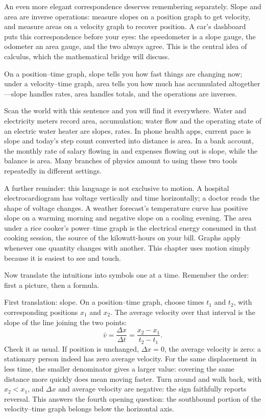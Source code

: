 An even more elegant correspondence deserves remembering separately. Slope and area are inverse operations: measure slopes on a position graph to get velocity, and measure areas on a velocity graph to recover position. A car's dashboard puts this correspondence before your eyes: the speedometer is a slope gauge, the odometer an area gauge, and the two always agree. This is the central idea of calculus, which the mathematical bridge will discuss.


\begin{oneline}
On a position--time graph, slope tells you how fast things are changing now; under a velocity--time graph, area tells you how much has accumulated altogether---slope handles rates, area handles totals, and the operations are inverses.
\end{oneline}

Scan the world with this sentence and you will find it everywhere. Water and electricity meters record area, accumulation; water flow and the operating state of an electric water heater are slopes, rates. In phone health apps, current pace is slope and today's step count converted into distance is area. In a bank account, the monthly rate of salary flowing in and expenses flowing out is slope, while the balance is area. Many branches of physics amount to using these two tools repeatedly in different settings.

A further reminder: this language is not exclusive to motion. A hospital electrocardiogram has voltage vertically and time horizontally; a doctor reads the shape of voltage changes. A weather forecast's temperature curve has positive slope on a warming morning and negative slope on a cooling evening. The area under a rice cooker's power--time graph is the electrical energy consumed in that cooking session, the source of the kilowatt-hours on your bill. Graphs apply whenever one quantity changes with another. This chapter uses motion simply because it is easiest to see and touch.


Now translate the intuitions into symbols one at a time. Remember the order: first a picture, then a formula.

First translation: slope. On a position--time graph, choose times \(t_1\) and \(t_2\), with corresponding positions \(x_1\) and \(x_2\). The average velocity over that interval is the slope of the line joining the two points:
\[
\bar{v}=\frac{\Delta x}{\Delta t}=\frac{x_2-x_1}{t_2-t_1}.
\]
Check it as usual. If position is unchanged, \(\Delta x=0\), the average velocity is zero: a stationary person indeed has zero average velocity. For the same displacement in less time, the smaller denominator gives a larger value: covering the same distance more quickly does mean moving faster. Turn around and walk back, with \(x_2<x_1\), and \(\Delta x\) and average velocity are negative: the sign faithfully reports reversal. This answers the fourth opening question: the southbound portion of the velocity--time graph belongs below the horizontal axis.

